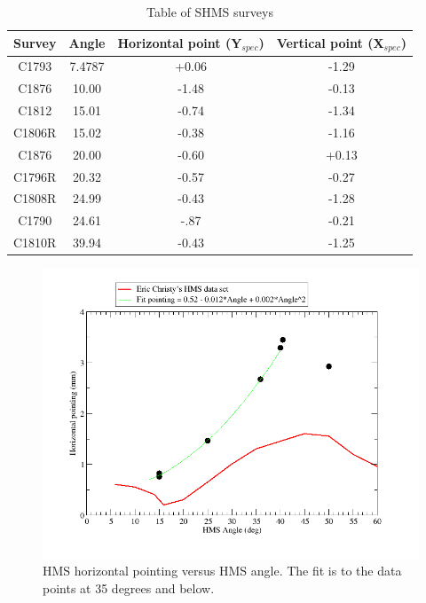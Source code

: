 \documentclass[]{article}
\begin{document}
			 	\begin{table}[h]
				\begin{center}
						\begin{tabular}[]{|c|c||c|c|} \hline\hline
		Survey & Angle  & Horizontal point (Y$_{spec}$) & Vertical point (X$_{spec}$)\\ \hline
        C1793  & 7.4787 & +0.06 & -1.29 \\ \hline
		C1876  & 10.00 & -1.48& -0.13\\ \hline
		C1812  & 15.01  & -0.74 & -1.34 \\ \hline
		C1806R & 15.02 & -0.38 & -1.16 \\ \hline
		C1876  & 20.00 & -0.60& +0.13\\ \hline
		C1796R & 20.32 & -0.57& -0.27\\ \hline
		C1808R & 24.99  & -0.43 & -1.28 \\ \hline
	    C1790  & 24.61 & -.87   &  -0.21 \\ \hline
		C1810R & 39.94  & -0.43 & -1.25 \\ \hline
		 		 	\end{tabular}
	\caption{Table of SHMS surveys}
	\label{tab:shms}
				\end{center}
				
	
		\end{table}
		\begin{figure}[h]	
			\begin{center}
				\includegraphics[width=0.8\columnwidth]{hms_horizontal_pointing.png}
			\end{center}
			\caption{HMS horizontal pointing versus HMS angle. The fit is to the data points at 35 degrees and below. }
			\label{fig:hms_horz_pointing}
		\end{figure}
		
\end{document}

